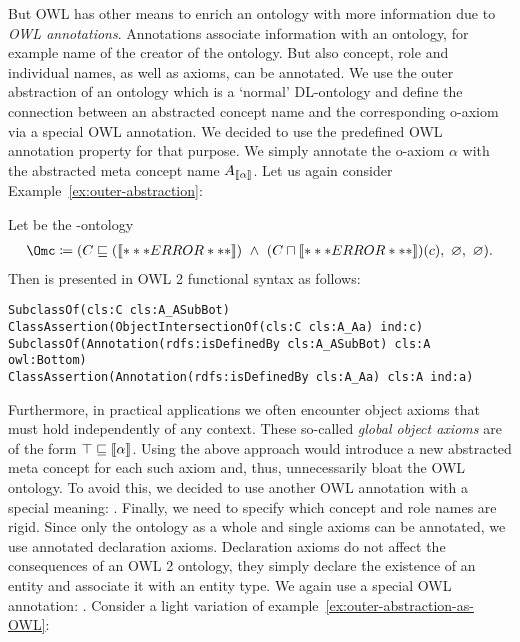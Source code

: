 But OWL has other means to enrich an ontology with more information due to \emph{OWL
  annotations}. Annotations associate information with an ontology, for example name of the creator
of the ontology. But also concept, role and individual names, as well as axioms, can be annotated. We use the
outer abstraction of an ontology which is a `normal' DL-ontology and define the connection between
an abstracted concept name and the corresponding o-axiom via a special OWL annotation. We decided to
use the predefined OWL annotation property \rdfsIsDefinedBy for that purpose. We simply
annotate the o-axiom $\alpha$ with the abstracted meta concept name $A_{\llbracket\alpha\rrbracket}$.
%
Let us again consider Example~\ref{ex:outer-abstraction}:
\begin{example}\label{ex:outer-abstraction-as-OWL}
  Let \Omc be the \ALCALC-ontology
  \begin{align*}
    \Omc \coloneqq (C\sqsubseteq(\oax{A\sqsubseteq\bot})\ \land\ (C\sqcap\oax{A(a)})(c),\ \emptyset,\ \emptyset).
  \end{align*}
Then \Omc is presented in OWL 2 functional syntax as follows:

\smallskip\noindent
\verb+SubclassOf(cls:C cls:A_ASubBot)+\\
\verb+ClassAssertion(ObjectIntersectionOf(cls:C cls:A_Aa) ind:c)+\\
\verb+SubclassOf(Annotation(rdfs:isDefinedBy cls:A_ASubBot) cls:A owl:Bottom)+\\
\verb+ClassAssertion(Annotation(rdfs:isDefinedBy cls:A_Aa) cls:A ind:a)+
\end{example}

Furthermore, in practical applications we often encounter object axioms that must hold independently
of any context. These so-called \emph{global object axioms} are of the form
$\top \sqsubseteq \llbracket\alpha\rrbracket$. Using the above approach would introduce a new abstracted meta concept
for each such axiom and, thus, unnecessarily bloat the OWL ontology. To avoid this, we decided to use
another OWL annotation with a special meaning: \rdfsLabelGlobal.
%
Finally, we need to specify which concept and role names are rigid. Since only the ontology as a whole
and single axioms can be annotated, we use annotated declaration axioms. Declaration axioms do not
affect the consequences of an OWL 2 ontology, they simply declare the existence of an entity and
associate it with an entity type. We again use a special OWL annotation: \rdfsLabelRigid.
%
Consider a light variation of example~\ref{ex:outer-abstraction-as-OWL}:

